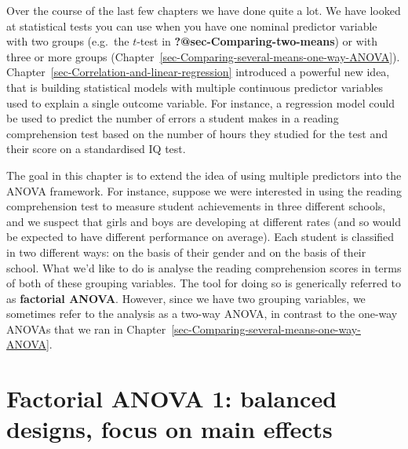 \documentclass[
  a4paper,
]{book}
\begin{document}
Over the course of the last few chapters we have done quite a lot. We
have looked at statistical tests you can use when you have one nominal
predictor variable with two groups (e.g.~the \(t\)-test in
\textbf{?@sec-Comparing-two-means}) or with three or more groups
(Chapter~\ref{sec-Comparing-several-means-one-way-ANOVA}).
Chapter~\ref{sec-Correlation-and-linear-regression} introduced a
powerful new idea, that is building statistical models with multiple
continuous predictor variables used to explain a single outcome
variable. For instance, a regression model could be used to predict the
number of errors a student makes in a reading comprehension test based
on the number of hours they studied for the test and their score on a
standardised IQ test.

The goal in this chapter is to extend the idea of using multiple
predictors into the ANOVA framework. For instance, suppose we were
interested in using the reading comprehension test to measure student
achievements in three different schools, and we suspect that girls and
boys are developing at different rates (and so would be expected to have
different performance on average). Each student is classified in two
different ways: on the basis of their gender and on the basis of their
school. What we'd like to do is analyse the reading comprehension scores
in terms of both of these grouping variables. The tool for doing so is
generically referred to as \textbf{factorial ANOVA}. However, since we
have two grouping variables, we sometimes refer to the analysis as a
two-way ANOVA, in contrast to the one-way ANOVAs that we ran in
Chapter~\ref{sec-Comparing-several-means-one-way-ANOVA}.

\hypertarget{factorial-anova-1-balanced-designs-focus-on-main-effects}{%
\section{Factorial ANOVA 1: balanced designs, focus on main
effects}\label{factorial-anova-1-balanced-designs-focus-on-main-effects}}
\end{document}
